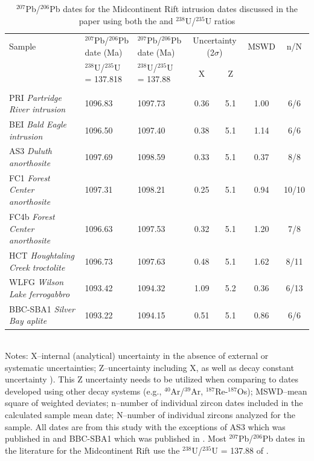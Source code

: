 \documentclass[11pt,letterpaper]{article}
\begin{document}
\renewcommand{\thetable}{DR\arabic{table}}
\addtocounter{table}{1}
\begin{table}[h!]
\footnotesize
\caption{$^{207}$Pb/$^{206}$Pb dates for the Midcontinent Rift intrusion dates discussed in the paper using both the \cite{Steiger1977a} and \cite{Hiess2012a} $^{238}$U/$^{235}$U ratios}
\begin{tabular}{|p{3 cm}|p{3.4 cm}|p{3.4 cm}|cc|c|c|}
\hline
Sample & $^{207}$Pb/$^{206}$Pb date (Ma) & $^{207}$Pb/$^{206}$Pb date (Ma) & \multicolumn{2}{|c|}{Uncertainty (2$\sigma$)} & MSWD & n/N \\
 &  $^{238}$U/$^{235}$U = 137.818 & $^{238}$U/$^{235}$U = 137.88 & X & Z & & \\
  &  \cite{Hiess2012a} & \cite{Steiger1977a} &  & & & \\
\hline
PRI \textit{Partridge River intrusion}  & 1096.83 & 1097.73  & 0.36 & 5.1 & 1.00 & 6/6 \\
\hline
BEI \textit{Bald Eagle intrusion} &  1096.50 & 1097.40 & 0.38 & 5.1 & 1.14 & 6/6 \\
\hline
AS3 \textit{Duluth anorthosite} &  1097.69 &  1098.59 & 0.33 & 5.1 & 0.37 & 8/8 \\
\hline
FC1 \textit{Forest Center anorthosite}   & 1097.31 & 1098.21 & 0.25 & 5.1 & 0.94 & 10/10 \\
\hline
FC4b \textit{Forest Center anorthosite}   & 1096.63 & 1097.53 & 0.32 & 5.1 & 1.20 & 7/8 \\
\hline
HCT \textit{Houghtaling Creek troctolite}   & 1096.73 & 1097.63 & 0.48 & 5.1 & 1.62 & 8/11 \\
\hline
WLFG \textit{Wilson Lake ferrogabbro}   & 1093.42 & 1094.32 & 1.09 & 5.2 & 0.36 & 6/13 \\
\hline
BBC-SBA1 \textit{Silver Bay aplite}  &  1093.22 & 1094.15 & 0.51 &5.1 & 0.86 & 6/6 \\
\hline
\end{tabular}\\

Notes: X--internal (analytical) uncertainty in the absence of external or systematic uncertainties; Z--uncertainty including X, as well as decay constant uncertainty \citep{Jaffey1971a}). This Z uncertainty needs to be utilized when comparing to dates developed using other decay systems (e.g., $^{40}$Ar/$^{39}$Ar, $^{187}$Re-$^{187}$Os); MSWD--mean square of weighted deviates; n--number of individual zircon dates included in the calculated sample mean date; N--number of individual zircons analyzed for the sample. All dates are from this study with the exceptions of AS3 which was published in \cite{Schoene2006a} and BBC-SBA1 which was published in \cite{Fairchild2017a}. Most $^{207}$Pb/$^{206}$Pb dates in the literature for the Midcontinent Rift use the $^{238}$U/$^{235}$U = 137.88 of \citet{Steiger1977a}.
\label{tab:geochron}
\end{table}
\end{document}
